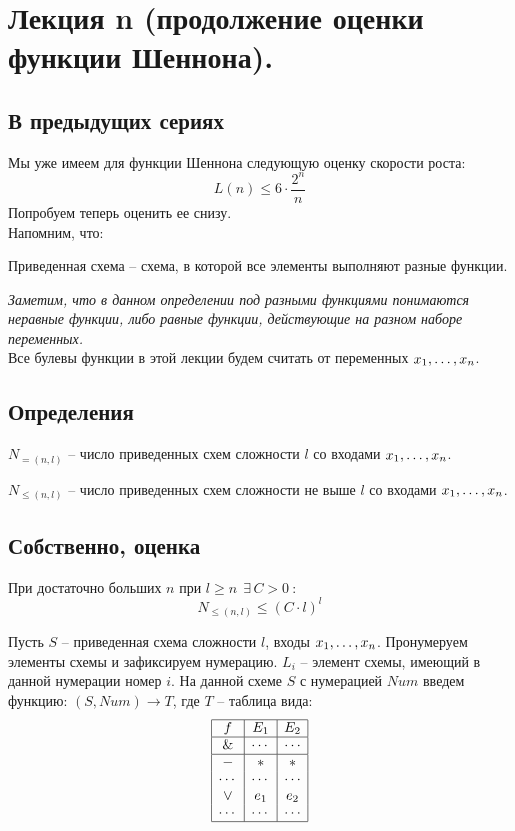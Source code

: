 \section{Лекция n (продолжение оценки функции Шеннона).} 
\subsection{В предыдущих сериях}
Мы уже имеем для функции Шеннона следующую оценку скорости роста:
$$ L(n)\leq 6\cdot \frac{2^n}{n}$$
Попробуем теперь оценить ее снизу.\\
Напомним, что:
\begin{definition}
Приведенная схема -- схема, в которой все элементы выполняют разные функции.
\end{definition}
\textit{Заметим, что в данном определении под разными функциями понимаются неравные функции, либо равные функции, действующие на разном наборе переменных.}\\
Все булевы функции в этой лекции будем считать от переменных $x_1, \ldots, x_n$.
\subsection{Определения}
\begin{definition}
$N_{=(n,l)}$ -- число приведенных схем сложности $l$ со входами $x_1, \ldots, x_n$.
\end{definition}
\begin{definition}
$N_{\leq(n,l)}$ -- число приведенных схем сложности не выше $l$ со входами $x_1, \ldots, x_n$.
\end{definition}
\subsection{Собственно, оценка}
\begin{lemma}
При достаточно больших $n$ при $l\geq n \:\: \exists \, C>0 \: : $\\
$$N_{\leq(n,l)}\leq (C\cdot l)^l $$
\end{lemma}
Пусть $S$ -- приведенная схема сложности $l$, входы $x_1, \ldots, x_n$.
Пронумеруем элементы схемы и зафиксируем нумерацию. $L_i$ -- элемент схемы, имеющий в данной нумерации номер $i$. На данной схеме $S$ с нумерацией $Num$ введем функцию:
$(S,Num)\rightarrow T$, где $T$ -- таблица вида:
$$
    \begin{array}{|c|c|c|}
    \hline
    f & E_1 & E_2 \\
    \hline
    \& & \cdots &  \cdots \\
    \hline
     - & * & * \\
     \cdots & \cdots & \cdots \\
    \vee & e_1 & e_2 \\
     \cdots & \cdots & \cdots \\
    \hline
    \end{array}
    $$
